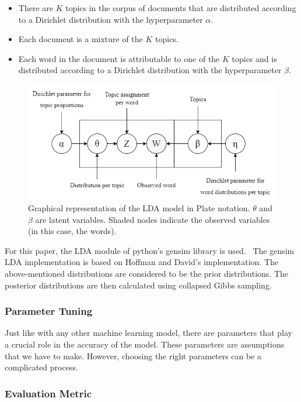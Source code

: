 \begin{itemize}
    \item There are $K$ topics in the corpus of documents that are distributed according to a Dirichlet distribution with the hyperparameter $\alpha$.
    \item Each document is a mixture of the $K$ topics.
    \item Each word in the document is attributable to one of the $K$ topics and is distributed according to a Dirichlet distribution with the hyperparameter $\beta$.
\end{itemize}

\begin{figure}
    \centering
    \includegraphics[width=1\textwidth]{resources/lda.drawio.png}
    \caption{Graphical representation of the LDA model in Plate notation. $\theta$ and $\beta$ are latent variables. Shaded nodes indicate the observed variables (in this case, the words).}
    \label{fig:lda}
\end{figure}

For this paper, the LDA module of python's gensim library is used.~\cite{rehurek_lrec} The gensim LDA implementation is based on Hoffman and David's implementation. The above-mentioned distributions are considered to be the prior distributions. The posterior distributions are then calculated using collapsed Gibbs sampling.

\subsubsection{Parameter Tuning}

Just like with any other machine learning model, there are parameters that play a crucial role in the accuracy of the model. These parameters are assumptions that we have to make. However, choosing the right parameters can be a complicated process.

\subsubsection*{Evaluation Metric}

